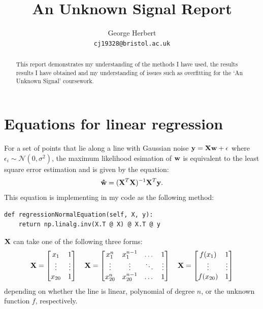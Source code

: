 \documentclass[onecolumn, 12pt, a4paper]{article}
\author{
  George Herbert\\
  \texttt{cj19328@bristol.ac.uk}
}
\title{An Unknown Signal Report}
\begin{document}
\maketitle

\begin{abstract}
    This report demonstrates my understanding of the methods I have 
    used, the results results I have obtained and my understanding
    of issues such as overfitting for the `An Unknown Signal'
    coursework.
\end{abstract}

\section{Equations for linear regression}

For a set of points that lie along a line with Gaussian noise 
$\vb{y} = \vb{X}\vb{w} + \vb{\epsilon}$ where $\epsilon_{i} \sim \mathcal{N}(0, \sigma^{2})$,
the maximum likelihood esimation of $\vb{w}$ is equivalent to
the least square error estimation and is given by the equation:
\[
    \vb{\hat{w}} = (\vb{X}^{T}\vb{X})^{-1}\vb{X}^{T}\vb{y}.
\]
This equation is implementing in my code as the following
method:
\begin{verbatim}
def regressionNormalEquation(self, X, y):
    return np.linalg.inv(X.T @ X) @ X.T @ y
\end{verbatim}

$\vb{X}$ can take one of the following
three forms:
\[
\vb{X} =
\begin{bmatrix}
    x_{1} & 1 \\
    \vdots & \vdots \\
    x_{20} & 1 \\
\end{bmatrix}
\quad
\vb{X} =
\begin{bmatrix}
    x_{1}^{n} & x_{1}^{n-1} & \dots & 1 \\
    \vdots & \vdots & \ddots & \vdots \\
    x_{20}^{n} & x_{20}^{n-1} & \dots & 1 \\
\end{bmatrix}
\quad
\vb{X} =
\begin{bmatrix}
    f(x_{1}) & 1 \\
    \vdots & \vdots \\
    f(x_{20}) & 1 \\
\end{bmatrix}
\]
depending on whether the line is linear, polynomial of degree $n$,
or the unknown function $f$, respectively.
\end{document}
